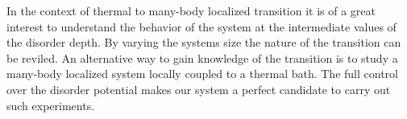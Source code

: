 In the context of thermal to many-body localized transition it is of a great interest to understand the behavior of the system at the intermediate values of the disorder depth. By varying the systems size the nature of the transition can be reviled. An alternative way to gain knowledge of the transition is to study a many-body localized system locally coupled to a thermal bath. The full control over the disorder potential makes our system a perfect candidate to carry out such experiments. 